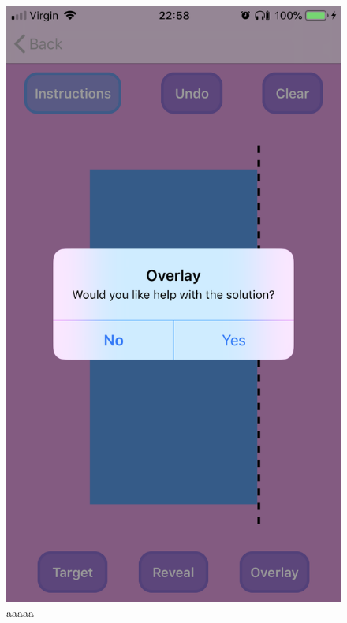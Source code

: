 \documentclass[11pt]{article}
\begin{document}
            \paragraph{}
            \begin{figure}[!ht]
                        \begin{minipage}{0.45\textwidth}
                            \centering \includegraphics[width=0.7\linewidth]{KiriZen/overlayPopUp.png}
                            \caption{aaaaa}
                            \label{fig:kiriZen-overlayPopUp}
                        \end{minipage}\hfill
                        \begin{minipage}{0.45\textwidth}
                            \centering

\end{minipage}
\end{figure}
\end{document}
